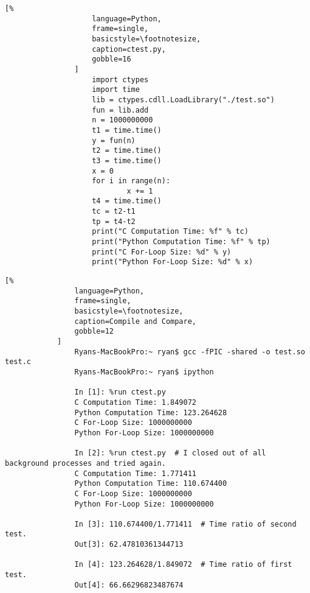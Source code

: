 \documentclass[crop=false,class=article,oneside]{standalone}
\begin{document}
            \begin{minipage}[t]{.48\textwidth}
                \centering
                \begin{lstlisting}[%
                    language=Python,
                    frame=single,
                    basicstyle=\footnotesize,
                    caption=ctest.py,
                    gobble=16
                ]
                    import ctypes
                    import time
                    lib = ctypes.cdll.LoadLibrary("./test.so")
                    fun = lib.add
                    n = 1000000000
                    t1 = time.time()
                    y = fun(n)
                    t2 = time.time()
                    t3 = time.time()
                    x = 0
                    for i in range(n):
                            x += 1
                    t4 = time.time()
                    tc = t2-t1
                    tp = t4-t2
                    print("C Computation Time: %f" % tc)
                    print("Python Computation Time: %f" % tp)
                    print("C For-Loop Size: %d" % y)
                    print("Python For-Loop Size: %d" % x)
                \end{lstlisting}
            \end{minipage}
            \begin{lstlisting}[%
                language=Python,
                frame=single,
                basicstyle=\footnotesize,
                caption=Compile and Compare,
                gobble=12
            ]
                Ryans-MacBookPro:~ ryan$ gcc -fPIC -shared -o test.so test.c
                Ryans-MacBookPro:~ ryan$ ipython
                
                In [1]: %run ctest.py
                C Computation Time: 1.849072
                Python Computation Time: 123.264628
                C For-Loop Size: 1000000000
                Python For-Loop Size: 1000000000
                
                In [2]: %run ctest.py  # I closed out of all background processes and tried again.
                C Computation Time: 1.771411
                Python Computation Time: 110.674400
                C For-Loop Size: 1000000000
                Python For-Loop Size: 1000000000
                
                In [3]: 110.674400/1.771411  # Time ratio of second test.
                Out[3]: 62.47810361344713
                
                In [4]: 123.264628/1.849072  # Time ratio of first test.
                Out[4]: 66.66296823487674
            \end{lstlisting}
\end{document}
